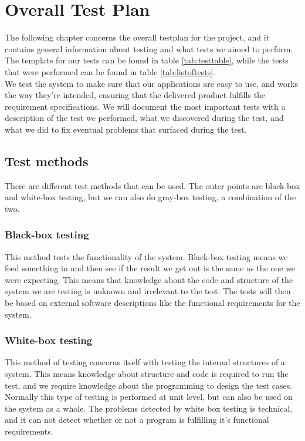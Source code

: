 \chapter{Overall Test Plan}
\label{chap:testPlan}
The following chapter concerns the overall testplan for the project, and it contains general
information about testing and what tests we aimed to perform. The template for our 
tests can be found in table \ref{tab:testtable}, while the tests that were performed can be found
in table \ref{tab:listoftests}.
\\
We test the system to 
make sure that our applications are easy to use, and works the way they're intended,
ensuring that the delivered product fulfills the requirement specifications. We 
will document the most important tests with a description of the test we performed, what we 
discovered during the test, and what we did to fix eventual problems that surfaced 
during the test.

\section{Test methods}
There are different test methods that can be used. The outer points are black-box and 
white-box testing, but we can also do gray-box testing, a combination of the two.

\subsection{Black-box testing}
This method tests the functionality of the system. Black-box testing means we feed 
something in and then see if the result we get out is the same as the one we were 
expecting. This means that knowledge about the code and structure of the system 
we are testing is unknown and irrelevant to the test. The tests will then be based on 
external software descriptions like the functional requirements for the system.

\subsection{White-box testing}
This method of testing concerns itself with testing the internal structures of a 
system. This means knowledge about structure and code is required to run the test, 
and we require knowledge about the programming to design the test cases. Normally 
this type of testing is performed at unit level, but can also be used on the system 
as a whole. The problems detected by white box testing is technical, and it can not 
detect whether or not a program is fulfilling it's functional requirements.

